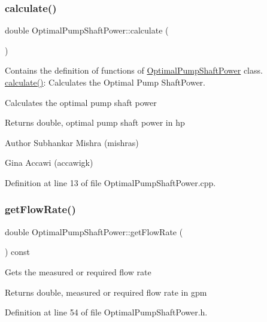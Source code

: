 \subsubsection{\texorpdfstring{calculate()}{calculate()}}
{\footnotesize\ttfamily double Optimal\+Pump\+Shaft\+Power\+::calculate (\begin{DoxyParamCaption}{ }\end{DoxyParamCaption})}



Contains the definition of functions of \hyperlink{class_optimal_pump_shaft_power}{Optimal\+Pump\+Shaft\+Power} class. \hyperlink{class_optimal_pump_shaft_power_a23ab040eea0a9e0431988bd353076237}{calculate()}\+: Calculates the Optimal Pump Shaft\+Power. 

Calculates the optimal pump shaft power

\begin{DoxyReturn}{Returns}
double, optimal pump shaft power in hp
\end{DoxyReturn}
\begin{DoxyAuthor}{Author}
Subhankar Mishra (mishras) 

Gina Accawi (accawigk) 
\end{DoxyAuthor}


Definition at line 13 of file Optimal\+Pump\+Shaft\+Power.\+cpp.

\mbox{\label{class_optimal_pump_shaft_power_a8c1532459a196347f7d5219d4690a490}} 
\subsubsection{\texorpdfstring{get\+Flow\+Rate()}{getFlowRate()}}
{\footnotesize\ttfamily double Optimal\+Pump\+Shaft\+Power\+::get\+Flow\+Rate (\begin{DoxyParamCaption}{ }\end{DoxyParamCaption}) const\hspace{0.3cm}{\ttfamily [inline]}}

Gets the measured or required flow rate \begin{DoxyReturn}{Returns}
double, measured or required flow rate in gpm 
\end{DoxyReturn}


Definition at line 54 of file Optimal\+Pump\+Shaft\+Power.\+h.

